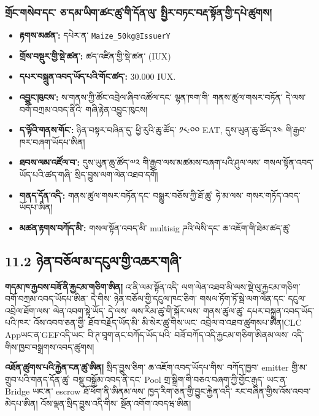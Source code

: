 \documentclass[11pt]{article}
\begin{document}
\subsubsection*{གྲོང་གསེབ་དང་ ཅ་དམ་ཡིག་ཚང་ཚུ་གི་དོན་ལུ་ སྤྱིར་བཏང་བརྡ་སྟོན་གྱི་དཔེ་ཚུགས།}

\begin{itemize}[leftmargin=*]
\item \textbf{རྟགས་མཚན་:} དཔེར་ན་ \texttt{Maize\_50kg@IssuerY}
\item \textbf{གྲོས་བསྡུར་གྱི་སྡེ་ཚན་:} ཚད་འཛིན་གྱི་སྡེ་ཚན་ (IUX)
\item \textbf{དཔར་བསྐྲུན་འབད་ཡོད་པའི་གོང་ཚད་:} 30.000 IUX.
\item \textbf{འབྱུང་ཁུངས་:} ས་གནས་ཀྱི་ཚོང་འབྲེལ་ཞིབ་འཚོལ་དང་ ལྷན་ཁག་གི་ གནས་ཚུལ་གསར་བཏོན་ དེ་ལས་ བགོ་བཀྲམ་འབད་ནིའི་ གཞི་རྟེན་འབྱུང་ཁུངས།
\item \textbf{ད་ལྟོའི་གནས་གོང་:} ཉིན་བསྟར་བཞིན་དུ་ ཕྱི་རུའི་ཆུ་ཚོད་ ༡༨:༠༠ EAT, དུས་ཡུན་ཆུ་ཚོད་༢༤ གི་རྒྱབ་ཁར་བཞག་ཡོདཔ་ཨིན།
\item \textbf{ཐབས་ལམ་འཛོལ་བ་:} དུས་ཡུན་ཆུ་ཚོད་༧༢ གི་རྒྱབ་ལས་མཚམས་བཞག་པའི་ཤུལ་ལས་ གསལ་སྟོན་འབད་ཡོད་པའི་ཚད་གཞི་ སྲིད་བྱུས་ལག་ལེན་འཐབ་དགོ།
\item \textbf{གནད་དོན་འདི་:} གནས་ཚུལ་གསར་བཏོན་དང་ བསྒྱུར་བཅོས་ཀྱི་ཐོ་ཚུ་ ཧེ་མ་ལས་ གསར་གཏོད་འབད་ཡོདཔ་ཨིན།
\item \textbf{མཚན་རྟགས་བཀོད་མི་:} གསལ་སྟོན་འབད་མི་ multisig ཌའི་ལེསི་དང་ ཆ་འཇོག་གི་ཐེམ་ཚད་ཚུ་
\end{itemize}
\subsection*{11.2 ཉེན་བཅོལ་མ་དངུལ་གྱི་འཆར་གཞི་}

\textbf{གདམ་ཁ་རྐྱབས་བཟོ་ནི་རྐྱངམ་གཅིག་ཨིན།} འ་ནི་ལམ་སྟོན་འདི་ ལག་ལེན་འཐབ་མི་ལས་སྡེ་ལུ་རྐྱངམ་གཅིག་ བགོ་བཀྲམ་འབད་ཡོདཔ་ཨིན་ དེ་གིས་ ཉེན་བཅོལ་གྱི་དངུལ་ཁང་ཅིག་ གསལ་ཏོག་ཏོ་སྦེ་ལག་ལེན་དང་ དངུལ་འབྲེལ་ཐོག་ལས་ ལེན་འབག་སྟེ་ཡོད་ དེ་ལས་ ལས་རིམ་ཚུ་གི་སྐོར་ལས་ གནས་ཚུལ་ཚུ་ དཔར་བསྐྲུན་འབད་ཡོད་པའི་ཁར་ འོས་འབབ་ཅན་གྱི་ ཐོབ་བརྗོད་ཡོད་མི་ མི་སེར་ཚུ་གིས་ཡང་ འབྲེལ་བ་འཐབ་ཚུགསཔ་ཨིན།CLC Appཡང་ན་GEFའདི་ཡང་ བི་ཊ་བཱག་ནང་བཀོད་ཡོད་པའི་ བཟོ་བཀོད་འདི་རྐྱངམ་གཅིག་ཨིནམ་ལས་ འདི་གིས་ཁྱབ་བསྒྲགས་འབད་ཚུགས།

\textbf{འཐོན་ཚུགས་པའི་རྐྱེན་ངན་ཚུ་ཨིན།} སྲིད་བྱུས་ཅིག་ ཆ་འཇོག་འབད་ཡོདཔ་གིས་ བཀོད་ཁྱབ་ emitter གྱི་མ་གྲུབ་པའི་གནད་དོན་ཚུ་ བསྡུ་བསྒྱོམ་འབད་ནི་དང་ Pool གྲ་སྒྲིག་གི་བཅའ་བཞག་ཀྱི་གྱོང་རྒུད་ ཡང་ན་ Bridge ཡང་ན་ escrow ཐོ་ཕོག་ནི་ཨིནམ་ལས་ ཁྱད་རིག་ཅན་གྱི་བྱུང་རྐྱེན་འདི་ རང་བཞིན་གྱིས་འོས་འབབ་མེདཔ་ཨིན། འོས་ལྡན་སྲིད་བྱུས་འདི་གིས་ སྔོན་འགོག་འབདཝ་ཨིན།
\end{document}
